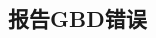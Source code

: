 \documentclass[class=book, crop=false]{standalone}
\begin{document}
\begin{CJK}{UTF8}{gbsn}

\chapter{报告GBD错误}







\cleardoublepage

\end{CJK}
\end{document}
